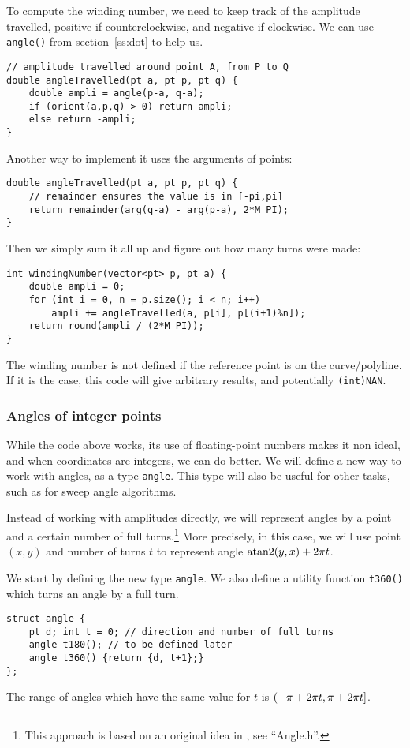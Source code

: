 To compute the winding number, we need to keep track of the amplitude travelled, positive if counterclockwise, and negative if clockwise. We can use \lstinline|angle()| from section~\ref{ss:dot} to help us.
\begin{lstlisting}
// amplitude travelled around point A, from P to Q
double angleTravelled(pt a, pt p, pt q) {
    double ampli = angle(p-a, q-a);
    if (orient(a,p,q) > 0) return ampli;
    else return -ampli;
}
\end{lstlisting}

Another way to implement it uses the arguments of points:
\begin{lstlisting}
double angleTravelled(pt a, pt p, pt q) {
    // remainder ensures the value is in [-pi,pi]
    return remainder(arg(q-a) - arg(p-a), 2*M_PI);
}
\end{lstlisting}

Then we simply sum it all up and figure out how many turns were made:
\begin{lstlisting}
int windingNumber(vector<pt> p, pt a) {
    double ampli = 0;
    for (int i = 0, n = p.size(); i < n; i++)
        ampli += angleTravelled(a, p[i], p[(i+1)%n]);
    return round(ampli / (2*M_PI));
}
\end{lstlisting}

\begin{warning}
The winding number is not defined if the reference point is on the curve/polyline. If it is the case, this code will give arbitrary results, and potentially \lstinline|(int)NAN|.
\end{warning}

\subsubsection{Angles of integer points}
While the code above works, its use of floating-point numbers makes it non ideal, and when coordinates are integers, we can do better. We will define a new way to work with angles, as a type \lstinline|angle|. This type will also be useful for other tasks, such as for sweep angle algorithms.

Instead of working with amplitudes directly, we will represent angles by a point and a certain number of full turns.\footnote{This approach is based on an original idea in \cite{kactl}, see ``Angle.h''.} More precisely, in this case, we will use point $(x,y)$ and number of turns $t$ to represent angle $\operatorname{atan2}(y,x) + 2\pi t$.

We start by defining the new type \lstinline|angle|. We also define a utility function \lstinline|t360()| which turns an angle by a full turn.
\begin{lstlisting}
struct angle {
    pt d; int t = 0; // direction and number of full turns
    angle t180(); // to be defined later
    angle t360() {return {d, t+1};}
};
\end{lstlisting}
The range of angles which have the same value for $t$ is $(-\pi + 2\pi t, \pi + 2\pi t]$.

